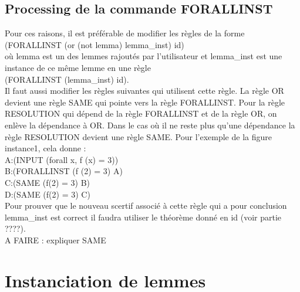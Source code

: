 \documentclass[11pt]{article}
\begin{document}
\subsection{Processing de la commande FORALLINST} \label{processing_forallinst}

Pour ces raisons, il est préférable de modifier les règles de la forme \\
     (FORALLINST (or (not lemma) lemma\_inst) id)\\
où lemma est un des lemmes rajoutés par l'utilisateur et lemma\_inst est une instance de ce même lemme en une règle \\

(FORALLINST (lemma\_inst) id).\\

Il faut aussi modifier les règles suivantes qui utilisent cette règle. La règle OR devient une règle SAME qui pointe vers la règle FORALLINST. Pour la règle RESOLUTION qui dépend de la règle FORALLINST et de la règle OR, on enlève la dépendance à OR. Dans le cas où il ne reste plus qu'une dépendance la règle RESOLUTION devient une règle SAME. Pour l'exemple de la figure instance1, cela donne : \\

A:(INPUT (forall x, f (x) = 3)) \\
B:(FORALLINST (f (2) = 3) A) \\
C:(SAME (f(2) = 3) B) \\
D:(SAME (f(2) = 3) C) \\

Pour prouver que le nouveau scertif associé à cette règle qui a pour conclusion lemma\_inst est correct il faudra utiliser le théorème donné en id (voir partie ????).\\

A FAIRE : expliquer SAME


\section{Instanciation de lemmes} \label{instanciations}
\end{document}
